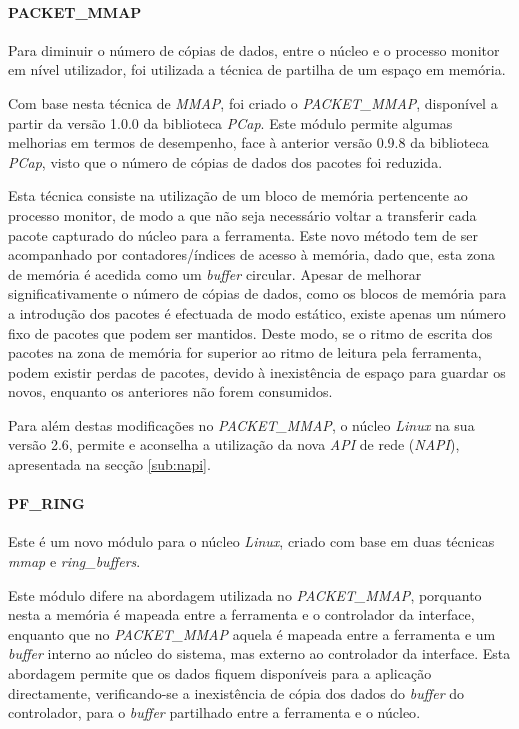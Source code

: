 \paragraph*{PACKET\_MMAP}

Para diminuir o número de cópias de dados, entre o núcleo e o processo monitor em nível utilizador, foi utilizada a técnica de partilha de um espaço em memória.

Com base nesta técnica de \textit{MMAP}, foi criado o \textit{PACKET\_MMAP}, disponível a partir da versão 1.0.0 da biblioteca \textit{PCap}.
Este módulo permite algumas melhorias em termos de desempenho, face à anterior versão 0.9.8 da biblioteca \textit{PCap}, visto que o número de cópias de dados dos pacotes foi reduzida.

Esta técnica consiste na utilização de um bloco de memória pertencente ao processo monitor, de modo a que não seja necessário voltar a transferir cada pacote capturado do núcleo para a ferramenta.
Este novo método tem de ser acompanhado por contadores/índices de acesso à memória, dado que, esta zona de memória é acedida como um \textit{buffer} circular.
Apesar de melhorar significativamente o número de cópias de dados, como os blocos de memória para a introdução dos pacotes é efectuada de modo estático, existe apenas um número fixo de pacotes que podem ser mantidos.
Deste modo, se o ritmo de escrita dos pacotes na zona de memória for superior ao ritmo de leitura pela ferramenta, podem existir perdas de pacotes, devido à inexistência de espaço para guardar os novos, enquanto os anteriores não forem consumidos.

Para além destas modificações no \textit{PACKET\_MMAP}, o núcleo \textit{Linux} na sua versão 2.6, permite e aconselha a utilização da nova \textit{API} de rede (\textit{NAPI}), apresentada na secção \ref{sub:napi}.




\paragraph*{PF\_RING}

Este é um novo módulo para o núcleo \textit{Linux}, criado com base em duas técnicas \textit{mmap} e \textit{ring\_buffers}.

Este módulo difere na abordagem utilizada no \textit{PACKET\_MMAP}, porquanto nesta a memória é mapeada entre a ferramenta e o controlador da interface, enquanto que no \textit{PACKET\_MMAP} aquela é mapeada entre a ferramenta e um \textit{buffer} interno ao núcleo do sistema, mas externo ao controlador da interface.
Esta abordagem permite que os dados fiquem disponíveis para a aplicação directamente, verificando-se a inexistência de cópia dos dados do \textit{buffer} do controlador, para o \textit{buffer} partilhado entre a ferramenta e o núcleo\cite{PFRING}.
 
